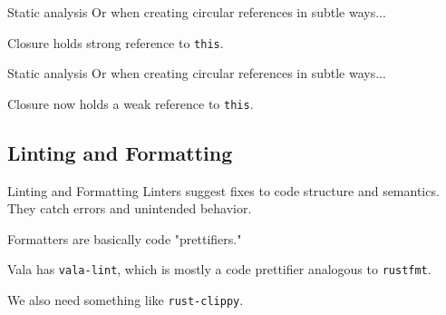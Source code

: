 \documentclass[t]{beamer}
\begin{document}

\begin{frame}{Static analysis}
    Or when creating circular references in subtle ways...
    
    \exampleCodeBad
    
    Closure holds strong reference to \texttt{this}.
\end{frame}

\begin{frame}{Static analysis}
    Or when creating circular references in subtle ways...
    
    \exampleCodeFixed
    
    Closure now holds a weak reference to \texttt{this}.
\end{frame}

\subsection{Linting and Formatting}
\begin{frame}[c]{Linting and Formatting}
    Linters suggest fixes to code structure and semantics. They catch errors and unintended behavior.
    
    Formatters are basically code "prettifiers."
    
    Vala has \texttt{vala-lint}, which is mostly a code prettifier analogous to \texttt{rustfmt}.
    
    We also need something like \texttt{rust-clippy}.
\end{frame}

\end{document}

